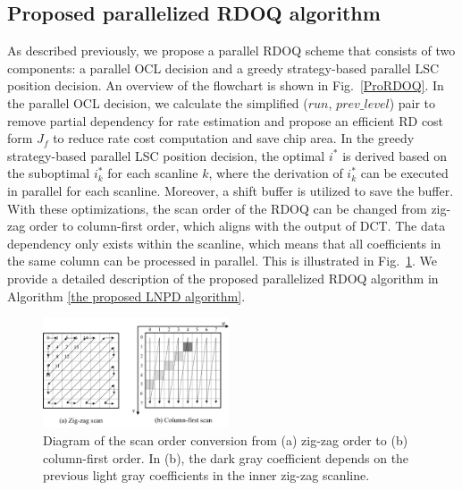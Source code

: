 \documentclass[lettersize,journal]{IEEEtran}
\begin{document}
\subsection{Proposed parallelized RDOQ algorithm}
\label{subsec:paraRDOQ}
As described previously, we propose a parallel RDOQ scheme that consists of two components: a parallel OCL decision and a greedy strategy-based parallel LSC position decision. An overview of the flowchart is shown in Fig.~\ref{ProRDOQ}. In the parallel OCL decision, we calculate the simplified ($run$, $prev\_level$) pair to remove partial dependency for rate estimation and propose an efficient RD cost form $J_{f}$ to reduce rate cost computation and save chip area. In the greedy strategy-based parallel LSC position decision, the optimal $i^{*}$ is derived based on the suboptimal $i_{k}^{*}$ for each scanline $k$, where the derivation of $i_{k}^{*}$ can be executed in parallel for each scanline. Moreover, a shift buffer is utilized to save the buffer. With these optimizations, the scan order of the RDOQ can be changed from zig-zag order to column-first order, which aligns with the output of DCT. The data dependency only exists within the scanline, which means that all coefficients in the same column can be processed in parallel. This is illustrated in Fig.~\ref{zig2col}. We provide a detailed description of the proposed parallelized RDOQ algorithm in Algorithm \ref{the proposed LNPD algorithm}. 
\begin{figure}[!h]
	\centering
	\centerline{\includegraphics[width=0.49\textwidth]{figure/zig2col.png}} 
	\caption{Diagram of the scan order conversion from (a) zig-zag order to (b) column-first order. In (b), the dark gray coefficient depends on the previous light gray coefficients in the inner zig-zag scanline.}
	\label{zig2col} %
\end{figure}
\end{document}
